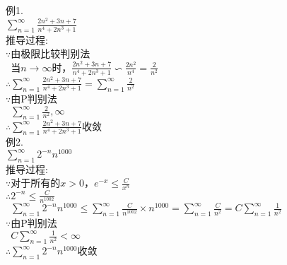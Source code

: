 例1.\\
$\displaystyle\sum_{n=1}^{\infty}\frac{2n^2+3n+7}{n^4+2n^3+1}$\\
推导过程:\\
$\because$由极限比较判别法\\
$\phantom{\because}$当$n\to\infty$时，$\displaystyle\frac{2n^2+3n+7}{n^4+2n^3+1}\backsim\frac{2n^2}{n^4}=\frac{2}{n^2}$\\
$\therefore\displaystyle\sum_{n=1}^{\infty}\frac{2n^2+3n+7}{n^4+2n^3+1}=\sum_{n=1}^{\infty}\frac{2}{n^2}$\\
$\because$由P判别法\\
$\phantom{\because}\displaystyle\sum_{n=1}^{\infty}\frac{2}{n^2},\infty$\\
$\therefore\displaystyle\sum_{n=1}^{\infty}\frac{2n^2+3n+7}{n^4+2n^3+1}$收敛\\[1ex]
例2.\\
$\displaystyle\sum_{n=1}^{\infty}2^{-n}n^{1000}$\\
推导过程:\\
$\because$对于所有的$x>0$，$\displaystyle e^{-x}\leqslant\frac{C}{x^n}$\\
$\therefore\displaystyle 2^{-n}\leqslant\frac{C}{n^{1002}}$\\
$\phantom{\therefore}\displaystyle\sum_{n=1}^{\infty}2^{-n}n^{1000}\leqslant\sum_{n=1}^{\infty}\frac{C}{n^{1002}}\times n^{1000}=\sum_{n=1}^{\infty}\frac{C}{n^2}=C\sum_{n=1}^{\infty}\frac{1}{n^2}$\\
$\because$由P判别法\\
$\phantom{\because}\displaystyle C\sum_{n=1}^{\infty}\frac{1}{n^2}<\infty$\\
$\therefore\displaystyle\sum_{n=1}^{\infty}2^{-n}n^{1000}$收敛
